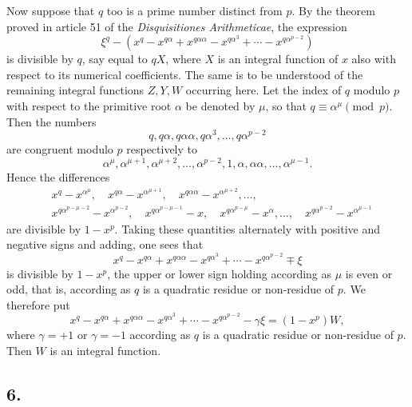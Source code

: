 \documentclass[12pt]{article}
\begin{document}
Now suppose that $q$ too is a prime number distinct from $p$. By the theorem proved in article 51 of the \emph{Disquisitiones Arithmeticae}, the expression
\[
\xi^q-\left(x^q-x^{q\alpha}+x^{q\alpha\alpha}-x^{q\alpha^3}+\cdots-x^{q\alpha^{p-2}}\right)
\]
is divisible by $q$, say equal to $qX$, where $X$ is an integral function of $x$ also with respect to its numerical coefficients. The same is to be understood of the remaining integral functions $Z,Y,W$ occurring here. Let the index of $q$ modulo $p$ with respect to the primitive root $\alpha$ be denoted by $\mu$, so that $q\equiv\alpha^\mu\pmod p$. Then the numbers
\[
q,q\alpha,q\alpha\alpha,q\alpha^3,\ldots,q\alpha^{p-2}
\]
are congruent modulo $p$ respectively to
\[
\alpha^\mu,\alpha^{\mu+1},\alpha^{\mu+2},\ldots,\alpha^{p-2},1,\alpha,\alpha\alpha,\ldots,\alpha^{\mu-1}.
\]
Hence the differences
\[
\begin{aligned}
&x^q-x^{\alpha^\mu},\quad x^{q\alpha}-x^{\alpha^{\mu+1}},\quad
x^{q\alpha\alpha}-x^{\alpha^{\mu+2}},\ldots,\\
&x^{q\alpha^{p-\mu-2}}-x^{\alpha^{p-2}},\quad
x^{q\alpha^{p-\mu-1}}-x,\quad
x^{q\alpha^{p-\mu}}-x^\alpha,\ldots,\quad
x^{q\alpha^{p-2}}-x^{\alpha^{\mu-1}}
\end{aligned}
\]
are divisible by $1-x^p$. Taking these quantities alternately with positive and negative signs and adding, one sees that
\[
x^q-x^{q\alpha}+x^{q\alpha\alpha}-x^{q\alpha^3}+\cdots-x^{q\alpha^{p-2}}\mp \xi
\]
is divisible by $1-x^p$, the upper or lower sign holding according as $\mu$ is even or odd, that is, according as $q$ is a quadratic residue or non-residue of $p$. We therefore put
\[
x^q-x^{q\alpha}+x^{q\alpha\alpha}-x^{q\alpha^3}+\cdots-x^{q\alpha^{p-2}}-\gamma\xi=(1-x^p)W,
\]
where $\gamma=+1$ or $\gamma=-1$ according as $q$ is a quadratic residue or non-residue of $p$. Then $W$ is an integral function.

\subsection*{6.}
\end{document}
